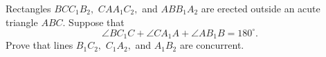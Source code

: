 Rectangles $BCC_1B_2,$ $CAA_1C_2,$ and $ABB_1A_2$ are erected outside an acute triangle $ABC.$ Suppose that \[\angle BC_1C+\angle CA_1A+\angle AB_1B=180^{\circ}.\]Prove that lines $B_1C_2,$ $C_1A_2,$ and $A_1B_2$ are concurrent.